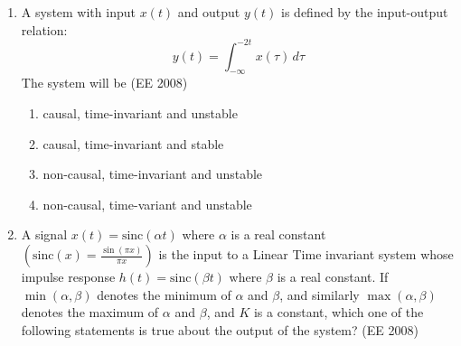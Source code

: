 \begin{enumerate}[label=\thesubsection.\arabic*,ref=\thesubsection.\theenumi]
\begin{multicols}{4}
\end{multicols}
\item A system with input $x(t)$ and output $y(t)$ is defined by the input-output relation:
$$
y(t) = \int_{-\infty}^{-2t} x(\tau) \,d\tau
$$
The system will be
\hfill (EE 2008)
\begin{enumerate}
    \item causal, time-invariant and unstable
    \item causal, time-invariant and stable
    \item non-causal, time-invariant and unstable
    \item non-causal, time-variant and unstable
\end{enumerate}
\item A signal $x(t)=\text{sinc}(\alpha t)$ where $\alpha$ is a real constant $\left(\text{sinc}(x) = \frac{\sin(\pi x)}{\pi x}\right)$ is the input to a Linear Time invariant system whose impulse response $h(t)=\text{sinc}(\beta t)$ where $\beta$ is a real constant. If $\min(\alpha, \beta)$ denotes the minimum of $\alpha$ and $\beta$, and similarly $\max(\alpha, \beta)$ denotes the maximum of $\alpha$ and $\beta$, and $K$ is a constant, which one of the following statements is true about the output of the system?
\hfill (EE 2008)


\end{enumerate}
